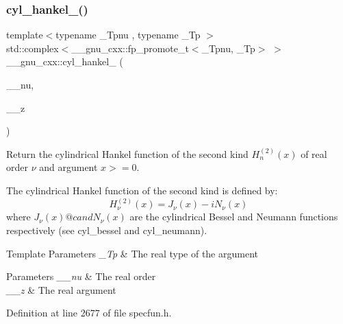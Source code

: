 \subsubsection{\texorpdfstring{cyl\+\_\+hankel\+\_()}{cyl\_hankel\_2()}\hspace{0.1cm}{\footnotesize\ttfamily [1/2]}}
{\footnotesize\ttfamily template$<$typename \+\_\+\+Tpnu , typename \+\_\+\+Tp $>$ \\
std\+::complex$<$\+\_\+\+\_\+gnu\+\_\+cxx\+::fp\+\_\+promote\+\_\+t$<$\+\_\+\+Tpnu, \+\_\+\+Tp$>$ $>$ \+\_\+\+\_\+gnu\+\_\+cxx\+::cyl\+\_\+hankel\+\_ (\begin{DoxyParamCaption}\item[{\+\_\+\+Tpnu}]{\+\_\+\+\_\+nu,  }\item[{\+\_\+\+Tp}]{\+\_\+\+\_\+z }\end{DoxyParamCaption})\hspace{0.3cm}{\ttfamily [inline]}}

Return the cylindrical Hankel function of the second kind $ H^{(2)}_n(x) $ of real order $ \nu $ and argument $ x >= 0 $.

The cylindrical Hankel function of the second kind is defined by\+: \[ H^{(2)}_\nu(x) = J_\nu(x) - iN_\nu(x) \] where $ J_\nu(x) @c and N_\nu(x) $ are the cylindrical Bessel and Neumann functions respectively (see cyl\+\_\+bessel and cyl\+\_\+neumann).


\begin{DoxyTemplParams}{Template Parameters}
{\em \+\_\+\+Tp} & The real type of the argument \\
\hline
\end{DoxyTemplParams}

\begin{DoxyParams}{Parameters}
{\em \+\_\+\+\_\+nu} & The real order \\
\hline
{\em \+\_\+\+\_\+z} & The real argument \\
\hline
\end{DoxyParams}


Definition at line 2677 of file specfun.\+h.

\mbox{\label{group__mathsf__gnu_ga326764c0d2dca072c411573503968e50}} 

